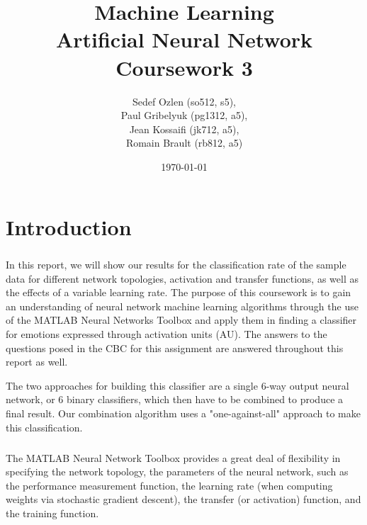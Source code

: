 \documentclass[a4paper,12pt,oneside,final]{report}
\author{
    Sedef Ozlen (so512, s5), \\ 
    Paul Gribelyuk (pg1312, a5), \\
    Jean Kossaifi (jk712, a5), \\ 
    Romain Brault (rb812, a5)
}
\title{\Huge Machine Learning \\ Artificial Neural Network \\ Coursework 3}
\date{\today}
\begin{document}
\maketitle
\tableofcontents
\listoffigures

\chapter{Introduction}
\paragraph{}



In this report, we will show our results for the classification rate of the sample data for different network topologies, activation and transfer functions, as well as the effects of a variable learning rate.   The purpose of this coursework is to gain an understanding of neural network machine learning algorithms through the use of the MATLAB Neural Networks Toolbox and apply them in finding a classifier for emotions expressed through activation units (AU).   The answers to the questions posed in the CBC for this assignment are answered throughout this report as well.

The two approaches for building this classifier are a single 6-way output neural network, or 6 binary classifiers, which then have to be combined to produce a final result.  Our combination algorithm uses a "one-against-all" approach to make this classification.
\paragraph{}
The MATLAB Neural Network Toolbox provides a great deal of flexibility in specifying the network topology, the parameters of the neural network, such as the performance measurement function, the learning rate (when computing weights via stochastic gradient descent), the transfer (or activation) function, and the training function.
\end{document}

